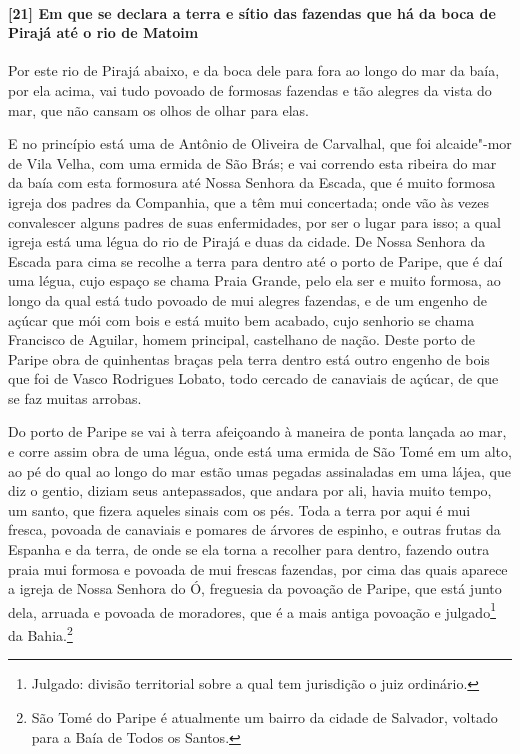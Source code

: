 \begin{linenumbers}
\paragraph{[21] Em que se declara a terra e sítio das fazendas que há da boca de Pirajá até
o rio de Matoim}\quad
Por este rio de Pirajá abaixo, e da boca dele para fora ao longo do mar da baía, por ela
acima, vai tudo povoado de formosas fazendas e tão alegres da vista do mar, que não cansam
os olhos de olhar para elas.

E no princípio está uma de Antônio de Oliveira de Carvalhal, que foi alcaide"-mor de Vila
Velha, com uma ermida de São Brás; e vai correndo esta ribeira do mar da baía com esta
formosura até Nossa \EP[1] Senhora da Escada, que é muito formosa igreja dos padres da
Companhia, que a têm mui concertada; onde vão às vezes convalescer alguns padres de suas
enfermidades, por ser o lugar para isso; a qual igreja está uma légua do rio de Pirajá e
duas da cidade. De Nossa Senhora da Escada para cima se recolhe a terra para dentro até o
porto de Paripe, que é daí uma légua, cujo espaço se chama Praia Grande, pelo ela ser e
muito formosa, ao longo da qual está tudo povoado de mui alegres fazendas, e de um engenho
de açúcar que mói com bois e está muito bem acabado, cujo senhorio se chama Francisco de
Aguilar, homem principal, castelhano de nação. Deste porto de Paripe obra de quinhentas
braças pela terra dentro está outro engenho de bois que foi de Vasco Rodrigues Lobato,
todo cercado de canaviais de açúcar, de que se faz muitas arrobas.

Do porto de Paripe se vai à terra afeiçoando à maneira de ponta lançada ao mar, e corre
assim obra de uma légua, onde está uma ermida de São Tomé em um alto, ao pé do qual ao
longo do mar estão umas pegadas assinaladas em uma lájea, que diz o gentio, diziam seus
antepassados, que andara por ali, havia muito tempo, um santo, que fizera aqueles sinais
com os pés. Toda a terra por aqui é mui fresca, povoada de canaviais e pomares de árvores
de espinho, e outras frutas da Espanha e da terra, de onde se ela torna a recolher para
dentro, fazendo outra praia mui formosa e povoada de mui frescas fazendas, por cima das
quais aparece a igreja de Nossa Senhora do Ó, freguesia da povoação de Paripe, que está
junto dela, arruada e povoada de moradores, que é a mais antiga povoação e
julgado\footnote{ Julgado: divisão territorial sobre a qual tem jurisdição o juiz
ordinário.} da Bahia.\footnote{ São Tomé do Paripe é atualmente um bairro da cidade de
Salvador, voltado para a Baía de Todos os Santos.}


\end{linenumbers}
